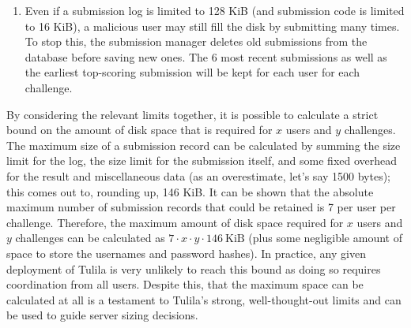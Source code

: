 \documentclass[12pt]{article}
\begin{document}
\begin{enumerate}
\begin{enumerate}
    \item Debug events do not have to be viewed immediately by the user over WebSocket. The submission log is also saved in the database. This log is limited to a configurable size of bytes (128 KiB by default) to prevent a large log from filling the disk. If the limit is exceeded, events are discarded starting with the oldest.
  \end{enumerate}
  \item Even if a submission log is limited to 128 KiB (and submission code is limited to 16 KiB), a malicious user may still fill the disk by submitting many times. To stop this, the submission manager deletes old submissions from the database before saving new ones. The 6 most recent submissions as well as the earliest top-scoring submission will be kept for each user for each challenge.
\end{enumerate}

By considering the relevant limits together, it is possible to calculate a strict bound on the amount of disk space that is required for $x$ users and $y$ challenges. The maximum size of a submission record can be calculated by summing the size limit for the log, the size limit for the submission itself, and some fixed overhead for the result and miscellaneous data (as an overestimate, let's say 1500 bytes); this comes out to, rounding up, 146 KiB. It can be shown that the absolute maximum number of submission records that could be retained is 7 per user per challenge. Therefore, the maximum amount of disk space required for $x$ users and $y$ challenges can be calculated as $7 \cdot x \cdot y \cdot 146\ \text{KiB}$ (plus some negligible amount of space to store the usernames and password hashes). In practice, any given deployment of Tulila is very unlikely to reach this bound as doing so requires coordination from all users. Despite this, that the maximum space can be calculated at all is a testament to Tulila's strong, well-thought-out limits and can be used to guide server sizing decisions.
\end{document}
